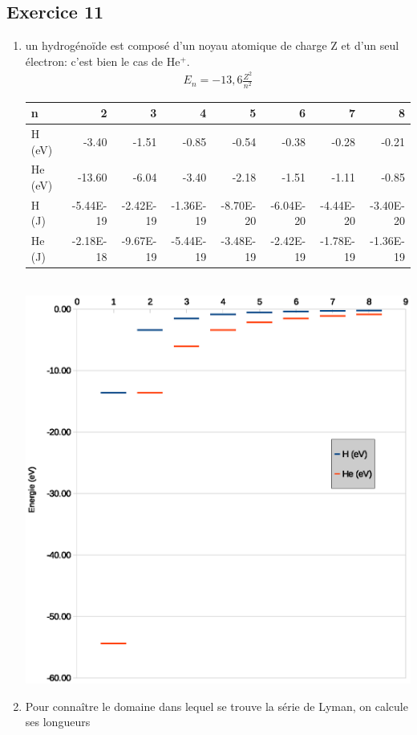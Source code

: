 \documentclass[12pt,french,dvips]{report}
\begin{document}
\subsection{Exercice 11}
\begin{enumerate}
\item un hydrogénoïde est composé d'un noyau atomique de charge Z et d'un seul électron: c'est bien le
cas de He$^+$.
\begin{align*}
E_n = -13,6 \frac{Z^2}{n^2}
\end{align*}
\begin{tabular}{lrrrrrrr}\hline
n & 2 & 3 & 4 & 5 & 6 & 7 & 8 \\ \hline \hline
H (eV)  & -3.40  & -1.51 & -0.85 & -0.54 & -0.38 & -0.28 & -0.21 \\
He (eV) & -13.60 & -6.04 & -3.40 & -2.18 & -1.51 & -1.11 & -0.85 \\
H (J)   & -5.44E-19 & -2.42E-19 & -1.36E-19 & -8.70E-20 & -6.04E-20 & -4.44E-20 & -3.40E-20 \\
He (J)  & -2.18E-18 & -9.67E-19 & -5.44E-19 & -3.48E-19 & -2.42E-19 & -1.78E-19 & -1.36E-19 \\
\hline \hline
\end{tabular}\\
\includegraphics[width=1.0\textwidth]{figure/niveaux.eps}
\item Pour connaître le domaine dans lequel se trouve la série de Lyman, on calcule ses longueurs

\end{enumerate}
\end{document}
